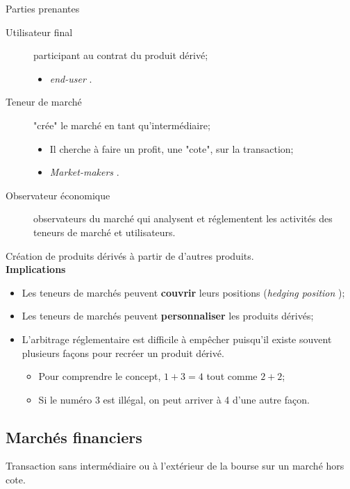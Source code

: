 \documentclass[10pt, french]{article}
\begin{document}
\begin{multicols*}{2}
\begin{conceptgen}{Parties prenantes}
\begin{description}
	\item[Utilisateur final]	participant au contrat du produit dérivé;
		\begin{itemize}
		\item	\og \textit{end-user} \fg{}.
		\end{itemize}
	\item[\hypertarget{market_holder}{Teneur de marché}]	"crée" le marché en tant qu'intermédiaire;
		\begin{itemize}[leftmargin = *]
		\item	Il cherche à faire un profit, une "cote", sur la transaction;
		\item	\og \textit{Market-makers} \fg{}.
		\end{itemize}
	\item[Observateur économique]	observateurs du marché qui analysent et réglementent les activités des teneurs de marché et utilisateurs.
\end{description}
\end{conceptgen}

\begin{definitionNOHFILL} 
Création de produits dérivés à partir de d'autres produits.\\

\textbf{Implications}
\begin{itemize}[leftmargin = *]
	\item	Les teneurs de marchés peuvent \textbf{couvrir} leurs positions (\og \textit{hedging position} \fg{});
	\item	Les teneurs de marchés peuvent \textbf{personnaliser} les produits dérivés;
	\item	L'arbitrage réglementaire est difficile à empêcher puisqu'il existe souvent plusieurs façons pour recréer un produit dérivé.
		\begin{itemize}[leftmargin = *]
		\item	Pour comprendre le concept, $1 + 3 = 4$ tout comme $2 + 2$;
		\item	Si le numéro 3 est illégal, on peut arriver à 4 d'une autre façon.
		\end{itemize}		 
\end{itemize}
\end{definitionNOHFILL}

\columnbreak

\subsection{Marchés financiers}
\begin{definitionNOHFILL} 
Transaction sans intermédiaire ou à l'extérieur de la bourse sur un marché hors cote. 


\end{definitionNOHFILL}
\end{multicols*}
\end{document}
